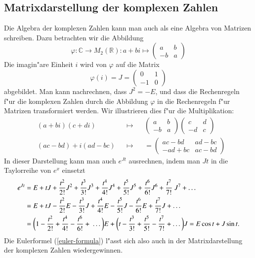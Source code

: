 \subsection{Matrixdarstellung der komplexen Zahlen\label{subsection:matrixdarstellung}}
Die Algebra der komplexen Zahlen kann man auch als eine Algebra von Matrizen
schreiben. Dazu betrachten wir die Abbildung
\[
\varphi\colon
\mathbb C\to M_2(\mathbb R):
a+bi\mapsto\begin{pmatrix}a&b\\-b&a\end{pmatrix}
\]
Die imagin"are Einheit $i$ wird von $\varphi$ auf die Matrix
\[
\varphi(i)=J=\begin{pmatrix}0&1\\-1&0\end{pmatrix}
\]
abgebildet. Man kann nachrechnen, dass $J^2=-E$, und dass die Rechenregeln
f"ur die komplexen Zahlen durch die Abbildung $\varphi$ in die Rechenregeln
f"ur Matrizen transformiert werden.
Wir illustrieren dies f"ur die Multiplikation:
\begin{align*}
&(a+bi)(c+di)&&\mapsto&
&\begin{pmatrix}a&b\\-b&a\end{pmatrix}
\begin{pmatrix}c&d\\-d&c\end{pmatrix}
\\
&(ac-bd) + i(ad-bc)&&\mapsto&
&=\begin{pmatrix}
ac-bd&ad-bc\\
-ad+bc&ac-bd
\end{pmatrix}
\end{align*}
In dieser Darstellung kann man auch $e^{Jt}$ ausrechnen, indem man $Jt$ in
die Taylorreihe von $e^x$ einsetzt
\begin{align}
e^{Jt}
&=
E + tJ + \frac{t^2}{2!} J^2 + \frac{t^3}{3!} J^3 + \frac{t^4}{4!} J^4
 + \frac{t^5}{5!} J^5 + \frac{t^6}{6!} J^6 + \frac{t^7}{7!} J^7 + \dots
\notag
\\
&=
E + tJ - \frac{t^2}{2!} E - \frac{t^3}{3!} J + \frac{t^4}{4!} E
 - \frac{t^5}{5!} J - \frac{t^6}{6!} E + \frac{t^7}{7!} J + \dots
\notag
\\
&=\biggl(1 - \frac{t^2}{2!} + \frac{t^4}{4!} - \frac{t^6}{6!} + \dots\biggr) E
+ \biggl(t - \frac{t^3}{3!} + \frac{t^5}{5!} - \frac{t^7}{7!} + \dots\biggr) J
= E \cos t + J \sin t.
\label{eulermatrixdarstellung}
\end{align}
Die Eulerformel (\ref{euler-formula}) l"asst sich also auch in der
Matrixdarstellung der komplexen Zahlen wiedergewinnen.

